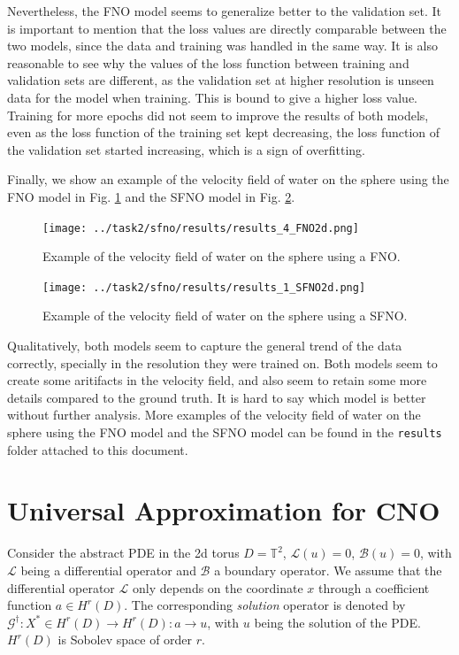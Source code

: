 \documentclass[unicode,11pt,a4paper,oneside,numbers=endperiod,openany]{scrartcl}
\begin{document}
Nevertheless, the FNO model seems to generalize better to the validation set.
It is important to mention that the loss values are directly comparable
between the two models, since the data and training was handled in the same way.
It is also reasonable to see why the values of the loss function between
training and validation sets are different, as the validation set at higher
resolution is unseen data for the model when training.
This is bound to give a higher loss value. Training for more epochs did not seem
to improve the results of both models, even as the loss function of the training
set kept decreasing, the loss function of the validation set started increasing,
which is a sign of overfitting.

Finally, we show an example of the velocity field of water on the sphere using
the FNO model in Fig. \ref{fig:example_fno2d} and the SFNO model in Fig.
\ref{fig:example_sfno2d}.
\begin{figure}[ht!]
    \centering
    \texttt{[image: ../task2/sfno/results/results\_4\_FNO2d.png]}
    \caption{Example of the velocity field of water on the sphere using a FNO.}
    \label{fig:example_fno2d}
\end{figure}
\begin{figure}[ht!]
    \centering
    \texttt{[image: ../task2/sfno/results/results\_1\_SFNO2d.png]}
    \caption{Example of the velocity field of water on the sphere using a SFNO.}
    \label{fig:example_sfno2d}
\end{figure}
Qualitatively, both models seem to capture the general trend of the data
correctly, specially in the resolution they were trained on. Both models seem to
create some aritifacts in the velocity field, and also seem to retain some more
details compared to the ground truth. It is hard to say which model is better
without further analysis.
More examples of the velocity field of water on the sphere using the FNO model
and the SFNO model can be found in the \texttt{results} folder attached to this document.

\section{Universal Approximation for CNO}\label{sec:task3}
Consider the abstract PDE in the 2d torus $D = \mathbb{T}^2$,
$\mathcal{L}(u) = 0$, $\mathcal{B}(u) = 0$,
with $\mathcal{L}$ being a differential operator and $\mathcal{B}$ a boundary operator. We assume that the differential
operator $\mathcal{L}$ only depends on the coordinate $x$ through a coefficient function
$a \in H^r(D)$. The corresponding \textit{solution} operator is denoted by 
$\mathcal{G}^{\dagger} : X^* \in H^r(D) \to H^r(D) : a \to u$, with $u$ being the
solution of the PDE. $H^r(D)$ is Sobolev space of order $r$.
\end{document}
